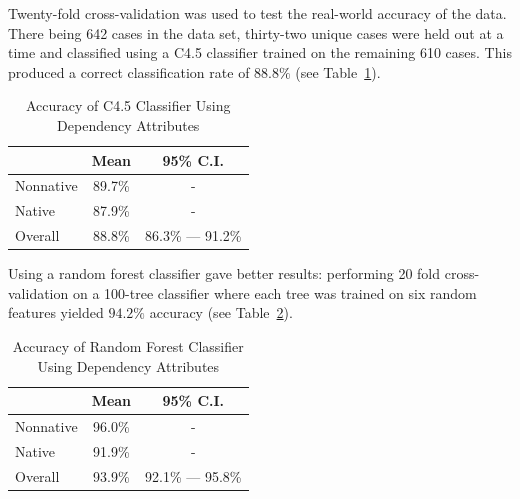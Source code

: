 \documentclass[main.tex]{subfiles}
\begin{document}
Twenty-fold cross-validation was used to test the real-world accuracy of the data. There being 642 cases in the data set, thirty-two unique cases were held out at a time and classified using a C4.5 classifier trained on the remaining 610 cases. This produced a correct classification rate of $88.8\%$ (see Table~\ref{table:dep-results-c45}).
\begin{table}[htb]
\centering
\caption{Accuracy of C4.5 Classifier Using Dependency Attributes}
\begin{tabular}{l c c}
\toprule
& Mean & 95\% C.I.\\
\midrule
Nonnative & 89.7\% & - \\
Native & 87.9\% & - \\
Overall & 88.8\% & 86.3\% --- 91.2\% \\
\bottomrule
\end{tabular}
\label{table:dep-results-c45}
\end{table}
Using a random forest classifier gave better results: performing 20 fold cross-validation on a 100-tree classifier where each tree was trained on six random features yielded $94.2\%$ accuracy (see Table~\ref{table:dep-results-rf}).
\begin{table}[htb]
\centering
\caption{Accuracy of Random Forest Classifier Using Dependency Attributes}
\begin{tabular}{l c c}
\toprule
& Mean & 95\% C.I.\\
\midrule
Nonnative & 96.0\% & - \\
Native & 91.9\% & - \\
Overall & 93.9\% & 92.1\% --- 95.8\% \\
\bottomrule
\end{tabular}
\label{table:dep-results-rf}
\end{table}

\biblio
\end{document}
